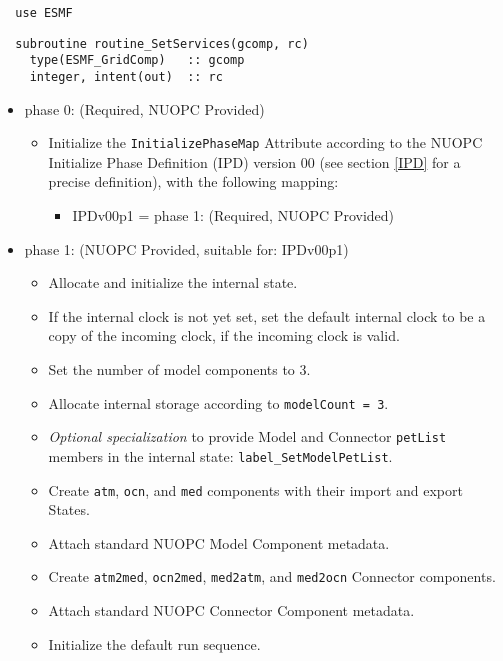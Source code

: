 \begin{verbatim}  use ESMF
\end{verbatim}

\begin{verbatim}  subroutine routine_SetServices(gcomp, rc)
    type(ESMF_GridComp)   :: gcomp
    integer, intent(out)  :: rc
\end{verbatim}

\begin{itemize}
\item phase 0: ({\sc Required, NUOPC Provided})
  \begin{itemize}
  \item Initialize the {\tt InitializePhaseMap} Attribute according to the NUOPC Initialize Phase Definition (IPD) version 00 (see section \ref{IPD} for a precise definition), with the following mapping:
    \begin{itemize}
    \item IPDv00p1 = phase 1: ({\sc Required, NUOPC Provided})
    \end{itemize}  
  \end{itemize}  
\item phase 1: ({\sc NUOPC Provided}, suitable for: IPDv00p1)
  \begin{itemize}
  \item Allocate and initialize the internal state.
  \item If the internal clock is not yet set, set the default internal clock to be a copy of the incoming clock, if the incoming clock is valid.
  \item Set the number of model components to 3.
  \item Allocate internal storage according to {\tt modelCount = 3}.
  \item {\it Optional specialization} to provide Model and Connector {\tt petList} members in the internal state: {\tt label\_SetModelPetList}.
  \item Create {\tt atm}, {\tt ocn}, and {\tt med} components with their import and export States.
  \item Attach standard NUOPC Model Component metadata.
  \item Create {\tt atm2med}, {\tt ocn2med}, {\tt med2atm}, and {\tt med2ocn} Connector components.
  \item Attach standard NUOPC Connector Component metadata.
  \item Initialize the default run sequence.

\end{itemize}
\end{itemize}
